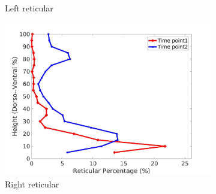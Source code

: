 \begin{figure}[H]
\begin{subfigure}{.42\linewidth}
  \caption{Left reticular}
  \label{fig:IPF14DiseaseDorsoToVentral-c} 
\end{subfigure} 
\begin{subfigure}{.42\linewidth}%
  \includegraphics[width=\linewidth,trim={{.0\wd0} {.0\wd0} {.0\wd0} {.0\wd0}},clip]{Appendix/Image_AppexA/DorsoToVentral/IPF14RightLungReticularDiseaseDorsoToVentral.jpg}
  \caption{Right reticular}
  \label{fig:IPF14DiseaseDorsoToVentral-d}
\end{subfigure}
\begin{subfigure}{.42\linewidth}%

\end{subfigure}
\end{figure}
